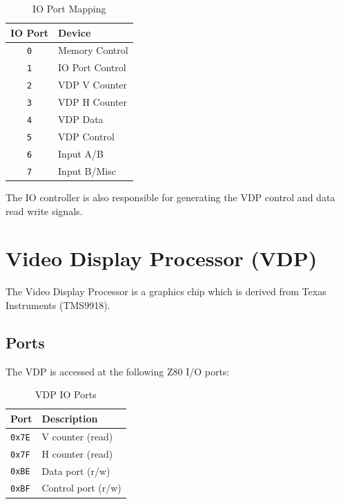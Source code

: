 \documentclass{article}
\begin{document}
\begin{table}[H]
    \centering
    \begin{tabular}{cl}
        \toprule
        \textbf{IO Port} & \textbf{Device} \\
        \midrule
        \texttt{0} & Memory Control \\
        \texttt{1} & IO Port Control\\
        \texttt{2} & VDP V Counter \\
        \texttt{3} & VDP H Counter \\
        \texttt{4} & VDP Data \\
        \texttt{5} & VDP Control \\
        \texttt{6} & Input A/B \\
        \texttt{7} & Input B/Misc \\
        \bottomrule
    \end{tabular}
    \caption{IO Port Mapping}
\end{table}

The IO controller is also responsible for generating the VDP control and
data read write signals.

\section{Video Display Processor (VDP)}

The Video Display Processor is a graphics chip which is derived from Texas
Instruments (TMS9918).

\subsection{Ports}

The VDP is accessed at the following Z80 I/O ports:

\begin{table}[H]
    \centering
    \begin{tabular}{ll}
        \toprule
        \textbf{Port} & \textbf{Description} \\
        \midrule
        \texttt{0x7E} & V counter (read) \\
        \texttt{0x7F} & H counter (read) \\
        \texttt{0xBE} & Data port (r/w)     \\
        \texttt{0xBF} & Control port (r/w)  \\
        \bottomrule
    \end{tabular}
    \caption{VDP IO Ports}
\end{table}
\end{document}
